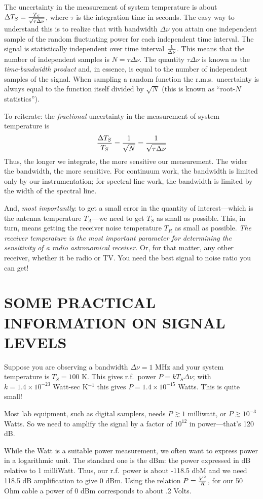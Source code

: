 \documentclass[12pt,psfig,preprint]{aastex}
\begin{document}
	The uncertainty in the measurement of system temperature is
about $\Delta T_S = {T_S \over \sqrt {\tau \Delta \nu}}$, where $\tau$
is the integration time in seconds.  The easy way to understand this is
to realize that with bandwidth $\Delta \nu$ you attain one independent
sample of the random fluctuating power for each independent time
interval. The signal is statistically independent over time interval ${1
\over \Delta \nu}$.  This means that the number of independent samples
is $N = \tau \Delta \nu$.  The quantity $\tau \Delta \nu$ is known as
the {\it time-bandwidth product} and, in essence, is equal to the number
of independent samples of the signal.  When sampling a random function
the r.m.s.\ uncertainty is always equal to the function itself divided
by $\sqrt N$ (this is known as ``root-$N$ statistics''). 

	To reiterate: the {\it fractional} uncertainty in the
measurement of system temperature is 
%
\begin{equation} {\Delta T_S \over T_S} = {1 \over \sqrt N} = {1 \over
\sqrt {\tau \Delta \nu}} 
\end{equation}
%
\noindent Thus, the longer we integrate, the more sensitive our
measurement.  The wider the bandwidth, the more sensitive.  For
continuum work, the bandwidth is limited only by our instrumentation;
for spectral line work, the bandwidth is limited by the width of the
spectral line. 

	And, {\it most importantly}: to get a small error in the
quantity of interest---which is the antenna temperature $T_A$---we need
to get $T_S$ as small as possible. This, in turn, means getting the
receiver noise temperature $T_R$ as small as possible. {\it The receiver
temperature is the most important parameter for determining the
sensitivity of a radio astronomical receiver.} Or, for that matter, any
other receiver, whether it be radio or TV. You need the best signal to
noise ratio you can get!


\section {SOME PRACTICAL INFORMATION ON SIGNAL LEVELS} 

	Suppose you are observing a bandwidth $\Delta \nu = 1$ MHz and
your system temperature is $T_S = 100$ K. This gives r.f.\ power $P =
kT_S\Delta \nu$; with $k = 1.4 \times 10^{-23}$ Watt-sec K$^{-1}$ this
gives $P = 1.4 \times 10^{-15}$ Watts. This is quite small!

	Most lab equipment, such as digital samplers, needs $P \gtrsim
1$ milliwatt, or $P \gtrsim 10^{-3}$ Watts. So we need to amplify the
signal by a factor of $10^{12}$ in power---that's 120 dB. 

	While the Watt is a suitable power measurement, we often want to
express power in a logarithmic unit. The standard one is the dBm: the
power expressed in dB relative to 1 milliWatt. Thus, our r.f.\ power is
about -118.5 dbM and we need 118.5 dB amplification to give 0 dBm. Using
the relation $P = {V^2 \over R}$, for our 50 Ohm cable a power of 0 dBm
corresponds to about .2 Volts.
\end{document}
